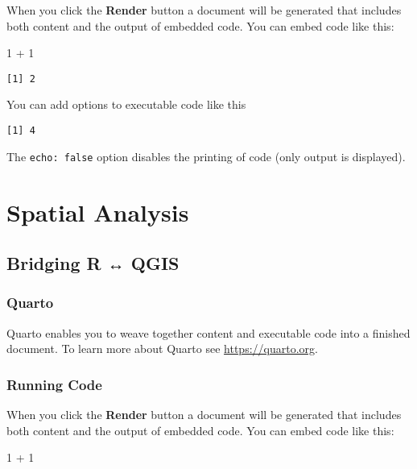 \documentclass[
  letterpaper,
  DIV=11,
  numbers=noendperiod]{scrreprt}
\newenvironment{Shaded}{\begin{snugshade}}{\end{snugshade}}
\newcommand{\DecValTok}[1]{\textcolor[rgb]{0.68,0.00,0.00}{#1}}
\newcommand{\SpecialCharTok}[1]{\textcolor[rgb]{0.37,0.37,0.37}{#1}}
\begin{document}
When you click the \textbf{Render} button a document will be generated
that includes both content and the output of embedded code. You can
embed code like this:

\begin{Shaded}
\begin{Highlighting}[]
\DecValTok{1} \SpecialCharTok{+} \DecValTok{1}
\end{Highlighting}
\end{Shaded}

\begin{verbatim}
[1] 2
\end{verbatim}

You can add options to executable code like this

\begin{verbatim}
[1] 4
\end{verbatim}

The \texttt{echo:\ false} option disables the printing of code (only
output is displayed).

\part{Spatial Analysis}

\hypertarget{bridging-r-qgis}{%
\chapter{Bridging R ↔ QGIS}\label{bridging-r-qgis}}

\hypertarget{quarto-5}{%
\section{Quarto}\label{quarto-5}}

Quarto enables you to weave together content and executable code into a
finished document. To learn more about Quarto see
\url{https://quarto.org}.

\hypertarget{running-code-5}{%
\section{Running Code}\label{running-code-5}}

When you click the \textbf{Render} button a document will be generated
that includes both content and the output of embedded code. You can
embed code like this:

\begin{Shaded}
\begin{Highlighting}[]
\DecValTok{1} \SpecialCharTok{+} \DecValTok{1}
\end{Highlighting}
\end{Shaded}
\end{document}
